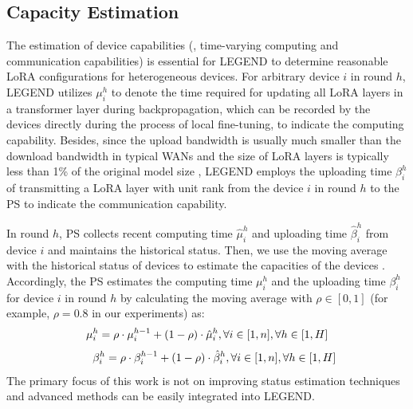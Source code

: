 \subsection{Capacity Estimation}
\vspace{-0.1cm}
The estimation of device capabilities (\eg, time-varying computing and communication capabilities) is essential for LEGEND to determine reasonable LoRA configurations for heterogeneous devices. 
For arbitrary device $i$ in round $h$, LEGEND utilizes $\mu_i^h$ to denote the time required for updating all LoRA layers in a transformer layer during backpropagation, which can be recorded by the devices directly during the process of local fine-tuning, to indicate the computing capability. 
Besides, since the upload bandwidth is usually much smaller than the download bandwidth in typical WANs \cite{mcmahan2017communication, konecny2016federated} and the size of LoRA layers is typically less than 1\% of the original model size \cite{zhang2023fedpetuning}, LEGEND employs the uploading time $\beta_i^h$ of transmitting a LoRA layer with unit rank from the device $i$ in round $h$ to the PS to indicate the communication capability.

In round $h$, PS collects recent computing time $\hat{\mu}_i^h$ and uploading time $\hat{\beta}_i^h$ from device $i$ and maintains the historical status.
Then, we use the moving average with the historical status of devices to estimate the capacities of the devices \cite{leroy2019federated}. 
Accordingly, the PS estimates the computing time $\mu_i^h$ and the uploading time $\beta_i^h$ for device $i$ in round $h$ by calculating the moving average with $\rho \in [0, 1]$ (for example, $\rho = 0.8$ in our experiments) as:
\vspace{-0.1cm}
\begin{equation}
\mu_i^h = \rho \cdot \mu_i^{h - 1} + (1 - \rho) \cdot \hat{\mu}_i^h, \forall i \in [1,n], \forall h \in [1,H]
\vspace{-0.1cm}
\end{equation}
\begin{equation}
\ \ \ \ \beta_i^h = \rho \cdot \beta_i^{h - 1} + (1 - \rho) \cdot \hat{\beta}_i^h, \forall i \in [1,n], \forall h \in [1,H]
\vspace{-0.1cm}
\end{equation}
The primary focus of this work is not on improving status estimation techniques and advanced methods \cite{halperin2010predictable, yue2017linkforecast} can be easily integrated into LEGEND.
\vspace{-0.2cm}


